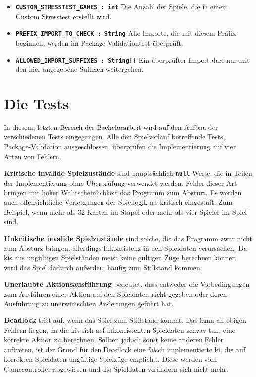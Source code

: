 \documentclass[
							a4paper, 
							11pt, 
							openany, 
							liststotoc,
							parskip=half, 
   							headings=normal
						]{scrreprt}
\begin{document}
{\begin{itemize}
	\item \textbf{\texttt{CUSTOM\_STRESSTEST\_GAMES : int}} Die Anzahl der Spiele, die in einem Custom Stresstest erstellt wird.
	\item \textbf{\texttt{PREFIX\_IMPORT\_TO\_CHECK : String}} Alle Importe, die mit diesem Präfix beginnen, werden im Package-Validationtest überprüft.
	\item \textbf{\texttt{ALLOWED\_IMPORT\_SUFFIXES : String[]}} Ein überprüfter Import darf nur mit den hier angegebene Suffixen weitergehen.
\end{itemize}

\clearpage

\section{Die Tests} \label{se:testing_tests}
In diesem, letzten Bereich der Bachelorarbeit wird auf den Aufbau der verschiedenen Tests eingegangen.\newline
Alle den Spielverlauf betreffende Tests, Package-Validation ausgeschlossen, überprüfen die Implementierung auf vier Arten von Fehlern.

\textbf{Kritische invalide Spielzustände}\newline
sind hauptsächlich \textbf{\texttt{null}}-Werte, die in Teilen der Implementierung ohne Überprüfung verwendet werden. Fehler dieser Art bringen mit hoher Wahrscheinlichkeit das Programm zum Absturz. Es werden auch offensichtliche Verletzungen der Spiellogik als kritisch eingestuft. Zum Beispiel, wenn mehr als 32 Karten im Stapel oder mehr als vier Spieler im Spiel sind.

\textbf{Unkritische invalide Spielzustände}\newline
sind solche, die das Programm zwar nicht zum Absturz bringen, allerdings Inkonsistenz in den Spieldaten verursachen. Da \acs{ki}s aus ungültigen Spielständen meist keine gültigen Züge berechnen können, wird das Spiel dadurch außerdem häufig zum Stillstand kommen.

\textbf{Unerlaubte Aktionsausführung}\newline
bedeutet, dass entweder die Vorbedingungen zum Ausführen einer Aktion auf den Spieldaten nicht gegeben oder deren Ausführung zu unerwünschten Änderungen geführt hat.

\textbf{Deadlock}\newline
tritt auf, wenn das Spiel zum Stillstand kommt. Das kann an obigen Fehlern liegen, da die \acs{ki}s sich auf inkonsistenten Spieldaten schwer tun, eine korrekte Aktion zu berechnen. Sollten jedoch sonst keine anderen Fehler auftreten, ist der Grund für den Deadlock eine falsch implementierte \acs{ki}, die auf korrekten Spieldaten ungültige Spielzüge empfiehlt. Diese werden vom Gamecontroller abgewiesen und die Spieldaten verändern sich nicht mehr.

}
\end{document}
